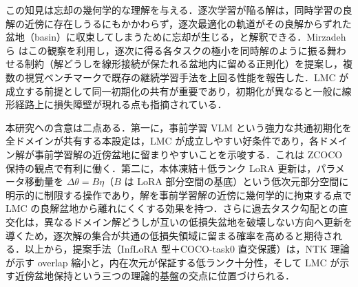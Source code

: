 この知見は忘却の幾何学的な理解を与える．逐次学習が陥る解は，同時学習の良解の近傍に存在しうるにもかかわらず，逐次最適化の軌道がその良解からずれた盆地（basin）に収束してしまうために忘却が生じる，と解釈できる．Mirzadeh ら \cite{lmc} はこの観察を利用し，逐次に得る各タスクの極小を同時解のように振る舞わせる制約（解どうしを線形接続が保たれる盆地内に留める正則化）を提案し，複数の視覚ベンチマークで既存の継続学習手法を上回る性能を報告した．LMC が成立する前提として同一初期化の共有が重要であり，初期化が異なると一般に線形経路上に損失障壁が現れる点も指摘されている．

本研究への含意は二点ある．第一に，事前学習 VLM という強力な共通初期化を全ドメインが共有する本設定は，LMC が成立しやすい好条件であり，各ドメイン解が事前学習解の近傍盆地に留まりやすいことを示唆する．これは ZCOCO 保持の観点で有利に働く．第二に，本体凍結＋低ランク LoRA 更新は，パラメータ移動量を $\Delta\theta=B\eta$（$B$ は LoRA 部分空間の基底）という低次元部分空間に明示的に制限する操作であり，解を事前学習解の近傍に幾何学的に拘束する点で LMC の良解盆地から離れにくくする効果を持つ．さらに過去タスク勾配との直交化は，異なるドメイン解どうしが互いの低損失盆地を破壊しない方向へ更新を導くため，逐次解の集合が共通の低損失領域に留まる確率を高めると期待される．以上から，提案手法（InfLoRA 型＋COCO-task0 直交保護）は，NTK 理論が示す overlap 縮小と，内在次元が保証する低ランク十分性，そして LMC が示す近傍盆地保持という三つの理論的基盤の交点に位置づけられる．
